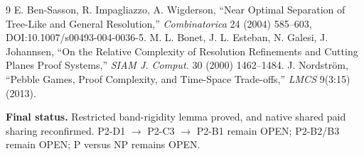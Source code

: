 \documentclass[11pt]{article}
\begin{document}
\begin{thebibliography}{9}
 E. Ben-Sasson, R. Impagliazzo, A. Wigderson, ``Near Optimal Separation of Tree-Like and General Resolution,''
\emph{Combinatorica} 24 (2004) 585--603, DOI:10.1007/s00493-004-0036-5.
 M. L. Bonet, J. L. Esteban, N. Galesi, J. Johannsen, ``On the Relative Complexity of Resolution Refinements and
Cutting Planes Proof Systems,'' \emph{SIAM J. Comput.} 30 (2000) 1462--1484.
 J. Nordstr\"om, ``Pebble Games, Proof Complexity, and Time-Space Trade-offs,'' \emph{LMCS} 9(3:15) (2013).
\end{thebibliography}

\noindent\textbf{Final status.} Restricted band-rigidity lemma proved, and native shared paid sharing reconfirmed. P2-D1 $\to$ P2-C3 $\to$ P2-B1
remain OPEN; P2-B2/B3 remain OPEN; P versus NP remains OPEN.
\end{document}
